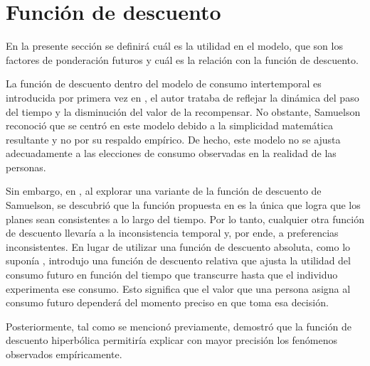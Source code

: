 \section{Función de descuento}
En la presente sección se definirá cuál es la utilidad en el modelo, que son los factores de ponderación futuros y cuál es la relación con la función de descuento.  

La función de descuento dentro del modelo de consumo intertemporal es introducida por primera vez en \parencite{Samuelson37}, el autor trataba de reflejar la dinámica del paso del tiempo y la disminución del valor de la recompensar. No obstante, Samuelson reconoció que se centró en este modelo debido a la simplicidad matemática resultante y no por su respaldo empírico. De hecho, este modelo no se ajusta adecuadamente a las elecciones de consumo observadas en la realidad de las personas. 

Sin embargo, en \parencite{Strotz55}, al explorar una variante de la función de descuento de Samuelson, se descubrió que la función propuesta en \parencite{Samuelson37} es la única que logra que los planes sean consistentes a lo largo del tiempo. Por lo tanto, cualquier otra función de descuento llevaría a la inconsistencia temporal y, por ende, a preferencias inconsistentes. En lugar de utilizar una función de descuento absoluta, como lo suponía \textcite{Samuelson37}, \textcite{Strotz55} introdujo una función de descuento relativa que ajusta la utilidad del consumo futuro en función del tiempo que transcurre hasta que el individuo experimenta ese consumo. Esto significa que el valor que una persona asigna al consumo futuro dependerá del momento preciso en que toma esa decisión.

Posteriormente, tal como se mencionó previamente, \textcite{Laibson97} demostró que la función de descuento hiperbólica permitiría explicar con mayor precisión los fenómenos observados empíricamente.

